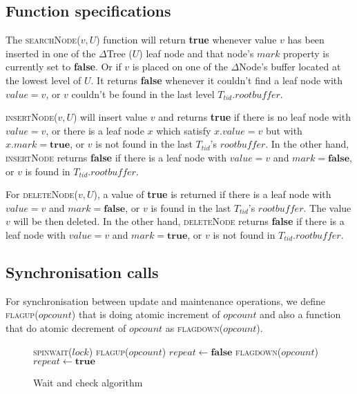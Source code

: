 


\subsection{Function specifications}
The \textsc{searchNode}($v, U$) function will return \textbf{true} whenever value $v$
has been inserted in one of the $\Delta$Tree ($U$) leaf node and that node's $mark$
property is currently set to \textbf{false}. Or if $v$ is placed on one of the 
$\Delta$Node's buffer located at the lowest level of $U$. It returns \textbf{false} whenever
it couldn't find a leaf node with $value=v$, or $v$ couldn't be found in 
the last level $T_{tid}.rootbuffer$. 

\textsc{insertNode}($v, U$) will insert value $v$ and returns \textbf{true} 
if there is no leaf node with $value=v$, or
there is a leaf node $x$ which satisfy $x.value=v$ but with $x.mark=\textbf{true}$, 
or $v$ is not found in the last $T_{tid}$'s $rootbuffer$.
In the other hand, \textsc{insertNode} returns \textbf{false} if there is a leaf node with 
$value=v$ and $mark=\textbf{false}$, or $v$ is found in $T_{tid}.rootbuffer$.

For \textsc{deleteNode}($v, U$), a value of \textbf{true} is returned if there
is a leaf node with $value=v$ and $mark=\textbf{false}$, or $v$ is found in the
last $T_{tid}$'s $rootbuffer$. The value $v$ will be then deleted.
In the other hand, \textsc{deleteNode} returns \textbf{false} if there is a leaf
node with $value=v$ and $mark=\textbf{true}$, or $v$ is not found in
$T_{tid}.rootbuffer$.


\subsection{Synchronisation calls}
For synchronisation between update and maintenance operations, we define
\textsc{flagup}($opcount$) that is doing atomic increment of $opcount$ and also
a function that do atomic decrement of $opcount$ as
\textsc{flagdown}($opcount$).

\begin{figure}[!t] \centering 
\begin{algorithmic}[1] 
\small
{}
    \Do
        \State \textsc{spinwait}($lock$) \label{lst:line:spinwait}
        \State \textsc{flagup}($opcount$) 
        \State $repeat \gets \textbf{false}$
            \State \textsc{flagdown}($opcount$) 
            \State $repeat \gets \textbf{true}$
        \EndIf
\EndFunction
\end{algorithmic}
\caption{Wait and check algorithm}
\label{lst:waitandcheck}
\end{figure}

